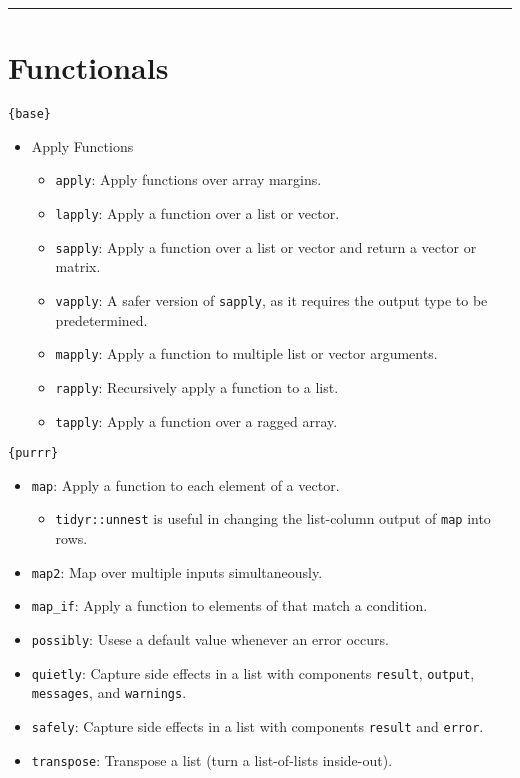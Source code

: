 \documentclass[
]{book}
\providecommand{\tightlist}{%
  \setlength{\itemsep}{0pt}\setlength{\parskip}{0pt}}
\begin{document}
\begin{center}\rule{0.5\linewidth}{0.5pt}\end{center}

\hypertarget{functionals}{%
\section{Functionals}\label{functionals}}

\texttt{\{base\}}

\begin{itemize}
\tightlist
\item
  Apply Functions

  \begin{itemize}
  \tightlist
  \item
    \texttt{apply}: Apply functions over array margins.
  \item
    \texttt{lapply}: Apply a function over a list or vector.
  \item
    \texttt{sapply}: Apply a function over a list or vector and return a vector or matrix.
  \item
    \texttt{vapply}: A safer version of \texttt{sapply}, as it requires the output type to be predetermined.
  \item
    \texttt{mapply}: Apply a function to multiple list or vector arguments.
  \item
    \texttt{rapply}: Recursively apply a function to a list.
  \item
    \texttt{tapply}: Apply a function over a ragged array.
  \end{itemize}
\end{itemize}

\texttt{\{purrr\}}

\begin{itemize}
\tightlist
\item
  \texttt{map}: Apply a function to each element of a vector.

  \begin{itemize}
  \tightlist
  \item
    \texttt{tidyr::unnest} is useful in changing the list-column output of \texttt{map} into rows.
  \end{itemize}
\item
  \texttt{map2}: Map over multiple inputs simultaneously.
\item
  \texttt{map\_if}: Apply a function to elements of that match a condition.
\item
  \texttt{possibly}: Usese a default value whenever an error occurs.
\item
  \texttt{quietly}: Capture side effects in a list with components \texttt{result}, \texttt{output}, \texttt{messages}, and \texttt{warnings}.
\item
  \texttt{safely}: Capture side effects in a list with components \texttt{result} and \texttt{error}.
\item
  \texttt{transpose}: Transpose a list (turn a list-of-lists inside-out).
\end{itemize}
\end{document}
